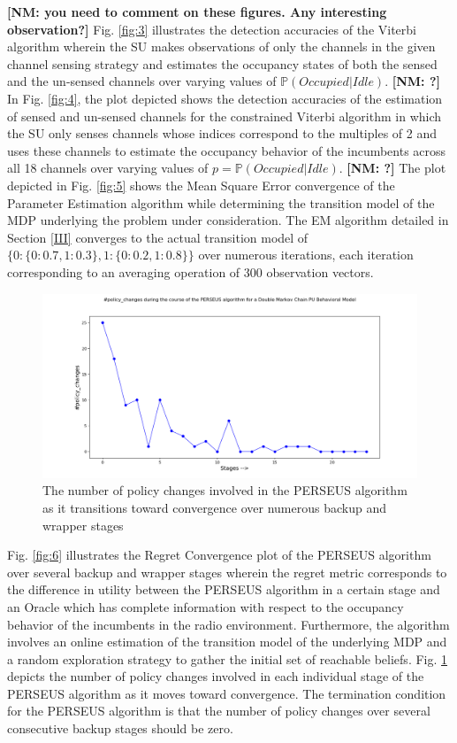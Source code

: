 \documentclass[10pt,twocolumn]{IEEEtran}
\newcommand{\nm}[1]{{\color{blue}\bf{[NM: #1]}}}
\newcommand{\add}[1]{{\color{red}{#1}}}
\begin{document}
\nm{you need to comment on these figures. Any interesting observation?}
 Fig. \ref{fig:3} illustrates the detection accuracies of the Viterbi algorithm wherein the SU makes observations of only the channels in the given channel sensing strategy and estimates the occupancy states of both the sensed and the un-sensed channels over varying values of $\mathbb{P}(Occupied|Idle)$. \add{We observe that .....}\nm{?} In Fig. \ref{fig:4}, the plot depicted shows the detection accuracies of the estimation of sensed and un-sensed channels for the constrained Viterbi algorithm in which the SU only senses channels whose indices correspond to the multiples of 2 and uses these channels to estimate the occupancy behavior of the incumbents across all 18 channels over varying values of $p = \mathbb{P}(Occupied|Idle)$. \add{We note that .....}\nm{?}
The plot depicted in Fig. \ref{fig:5} shows the Mean Square Error convergence of the Parameter Estimation algorithm while determining the transition model of the MDP underlying the problem under consideration. The EM algorithm detailed in Section \ref{III} converges to the actual transition model of $\{0: \{0: 0.7, 1: 0.3\}, 1: \{0: 0.2, 1: 0.8\}\}$ over numerous iterations, each iteration corresponding to an averaging operation of 300 observation vectors.
\begin{figure}
    \centering
    \includegraphics[scale=0.25]{Policy_Changes_Plot_04112019.png}
    \caption{The number of policy changes involved in the PERSEUS algorithm as it transitions toward convergence over numerous backup and wrapper stages}
    \label{fig:7}
\end{figure}
Fig. \ref{fig:6} illustrates the Regret Convergence plot of the PERSEUS algorithm over several backup and wrapper stages wherein the regret metric corresponds to the difference in utility between the PERSEUS algorithm in a certain stage and an Oracle which has complete information with respect to the occupancy behavior of the incumbents in the radio environment. Furthermore, the algorithm involves an online estimation of the transition model of the underlying MDP and a random exploration strategy to gather the initial set of reachable beliefs. Fig. \ref{fig:7} depicts the number of policy changes involved in each individual stage of the PERSEUS algorithm as it moves toward convergence. The termination condition for the PERSEUS algorithm is that the number of policy changes over several consecutive backup stages should be zero.


\end{document}
